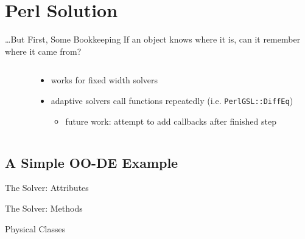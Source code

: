 \documentclass[mathserif]{beamer}
\providecommand{\code}[1]{{\texttt{\scriptsize{#1}}}}
\begin{document}
\section{Perl Solution}

\begin{frame}{\ldots But First, Some Bookkeeping}
  If an object knows where it is, can it remember where it came from?
  \begin{columns}
    \begin{column}{0.49\linewidth}
      \begin{block}{}
        \scriptsize
        
      \end{block}
    \end{column}
    \begin{column}{0.49\linewidth}
      \begin{itemize}
        \item works for fixed width solvers
        \item adaptive solvers call functions repeatedly (i.e. \code{PerlGSL::DiffEq})
          \begin{itemize}
            \item future work: attempt to add callbacks after finished step
          \end{itemize}
      \end{itemize}
    \end{column}
  \end{columns}
\end{frame}

\subsection{A Simple OO-DE Example}

\begin{frame}{The Solver: Attributes}
  \begin{block}{}
    \scriptsize
    
  \end{block}
\end{frame}

\begin{frame}{The Solver: Methods}
  \begin{block}{}
    \scriptsize
    
  \end{block}
\end{frame}

\begin{frame}{Physical Classes}
  \begin{block}{}
    \scriptsize
    
  \end{block}
\end{frame}
\end{document}
